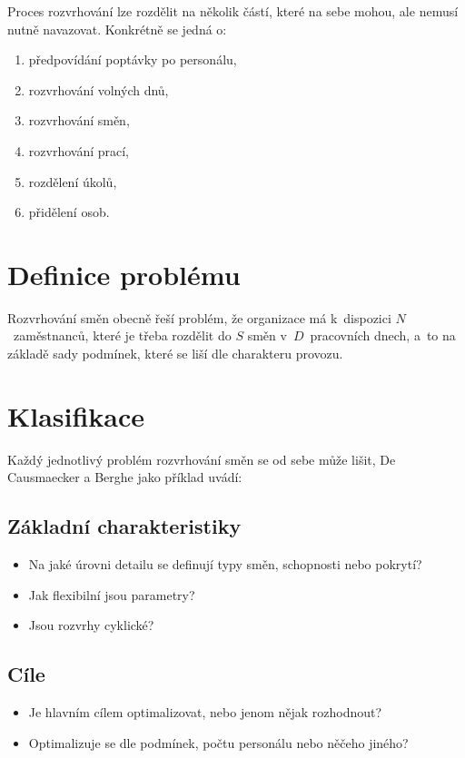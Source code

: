 \documentclass[a4paper,11pt,openany,twoside]{book}
\begin{document}
Proces rozvrhování lze rozdělit na několik částí, které na sebe mohou, ale nemusí nutně navazovat. \cite{ernst2004staff} Konkrétně se jedná o:
\begin{enumerate}
	\item předpovídání poptávky po personálu,
	\item rozvrhování volných dnů,
	\item rozvrhování směn,
	\item rozvrhování prací,
	\item rozdělení úkolů,
	\item přidělení osob.
\end{enumerate}

\section{Definice problému}

Rozvrhování směn obecně řeší problém, že organizace má k~dispozici $N$~zaměstnanců, které je třeba rozdělit do $S$ směn v~$D$~pracovních dnech, a~to na základě sady podmínek, které se liší dle charakteru provozu.

\section{Klasifikace}
\label{sec:clasif}

Každý jednotlivý problém rozvrhování směn se od sebe může lišit, De Causmaecker a Berghe \cite{de2011categorisation} jako příklad uvádí:

\subsection*{Základní charakteristiky}
\begin{itemize}
	\item Na jaké úrovni detailu se definují typy směn, schopnosti nebo pokrytí?
	\item Jak flexibilní jsou parametry?
	\item Jsou rozvrhy cyklické?
\end{itemize}


\subsection*{Cíle}
\begin{itemize}
	\item Je hlavním cílem optimalizovat, nebo jenom nějak rozhodnout?
	\item Optimalizuje se dle podmínek, počtu personálu nebo něčeho jiného?
\end{itemize}
\end{document}
